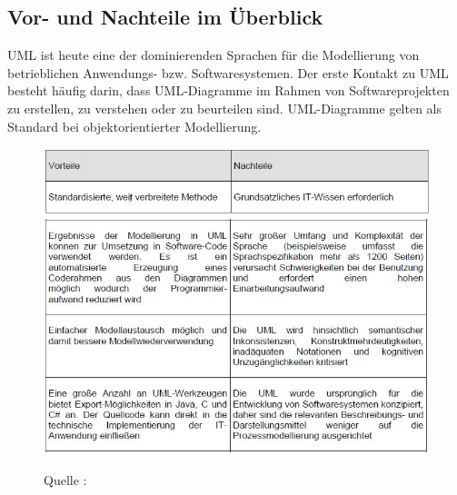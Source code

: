\subsection{Vor- und Nachteile im Überblick}
UML ist heute eine der dominierenden Sprachen für die Modellierung von betrieblichen Anwendungs- bzw. Softwaresystemen. Der erste Kontakt zu UML besteht häufig darin, dass UML-Diagramme im Rahmen von Softwareprojekten zu erstellen, zu verstehen oder zu beurteilen sind. UML-Diagramme gelten als Standard bei objektorientierter Modellierung.\\

\begin{center}
\begin{figure}[h]
   

\includegraphics[scale=1]{Graphics/vornach.jpg}
\includegraphics[scale=1]{Graphics/vornach2.jpg} 


Quelle : \cite{MT005} 

 
\label{fig6}


\end{figure}

\end{center}
\newpage